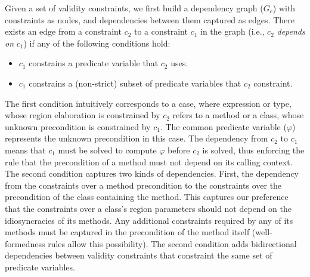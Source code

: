 Given a set of validity constraints, we first build a dependency graph
($G_c$) with constraints as nodes, and dependencies between them
captured as edges. There exists an edge from a constraint $c_2$ to a
constraint $c_1$ in the graph (i.e., $c_2$ \emph{depends on} $c_1$) if
any of the following conditions hold:
\begin{itemize}
\item $c_1$ constrains a predicate variable that $c_2$ uses. 
\item $c_1$ constrains a (non-strict) subset of predicate variables
that $c_2$ constraint.
\end{itemize}
The first condition intuitively corresponds to a case, where
expression or type, whose region elaboration is constrained by $c_2$
refers to a method or a class, whose unknown precondition is
constrained by $c_1$. The common predicate variable ($\varphi$)
represents the unknown precondition in this case. The dependency from
$c_2$ to $c_1$ means that $c_1$ must be solved to compute $\varphi$
before $c_2$ is solved, thus enforcing the rule that the precondition
of a method must not depend on its calling context. 
The second condition captures two kinds of dependencies. First, the
dependency from the constraints over a method precondition to the
constraints over the precondition of the class containing the method.
This captures our preference that the constraints over a class's
region parameters should not depend on the idiosyncracies of its
methods. Any additional constraints required by any of its methods
must be captured in the precondition of the method itself
(well-formedness rules allow this possibility). The second condition
adds bidirectional dependencies between validity constraints that
constraint the same set of predicate variables. 

